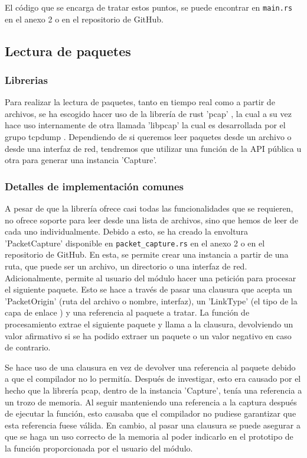El código que se encarga de tratar estos puntos, se puede encontrar en \texttt{main.rs} en el anexo 2 o en el repositorio de GitHub.

\subsection{Lectura de paquetes}

\subsubsection{Librerias}

Para realizar la lectura de paquetes, tanto en tiempo real como a partir de archivos, se ha escogido hacer uso de la librería de rust 'pcap' \cite{rustpcap}, la cual a su vez hace uso internamente de otra llamada 'libpcap' la cual es desarrollada por el grupo tcpdump \cite{libpcap}. Dependiendo de si queremos leer paquetes desde un archivo o desde una interfaz de red, tendremos que utilizar una función de la API pública u otra para generar una instancia 'Capture'. 

\subsubsection{Detalles de implementación comunes}

A pesar de que la librería ofrece casi todas las funcionalidades que se requieren, no ofrece soporte para leer desde una lista de archivos, sino que hemos de leer de cada uno individualmente. Debido a esto, se ha creado la envoltura 'PacketCapture' disponible en \texttt{packet\_capture.rs} en el anexo 2 o en el repositorio de GitHub. En esta, se permite crear una instancia a partir de una ruta, que puede ser un archivo, un directorio o una interfaz de red. Adicionalmente, permite al usuario del módulo hacer una petición para procesar el siguiente paquete. Esto se hace a través de pasar una clausura que acepta un 'PacketOrigin' (ruta del archivo o nombre, interfaz), un 'LinkType' (el tipo de la capa de enlace \cite{linktypetcpdump}) y una referencia al paquete a tratar. La función de procesamiento extrae el siguiente paquete y llama a la clausura, devolviendo un valor afirmativo si se ha podido extraer un paquete o un valor negativo en caso de contrario.

Se hace uso de una clausura en vez de devolver una referencia al paquete debido a que el compilador no lo permitía. Después de investigar, esto era causado por el hecho que la librería pcap, dentro de la instancia 'Capture', tenía una referencia a un trozo de memoria. Al seguir manteniendo una referencia a la captura después de ejecutar la función, esto causaba que el compilador no pudiese garantizar que esta referencia fuese válida. En cambio, al pasar una clausura se puede asegurar a que se haga un uso correcto de la memoria al poder indicarlo en el prototipo de la función proporcionada por el usuario del módulo.

